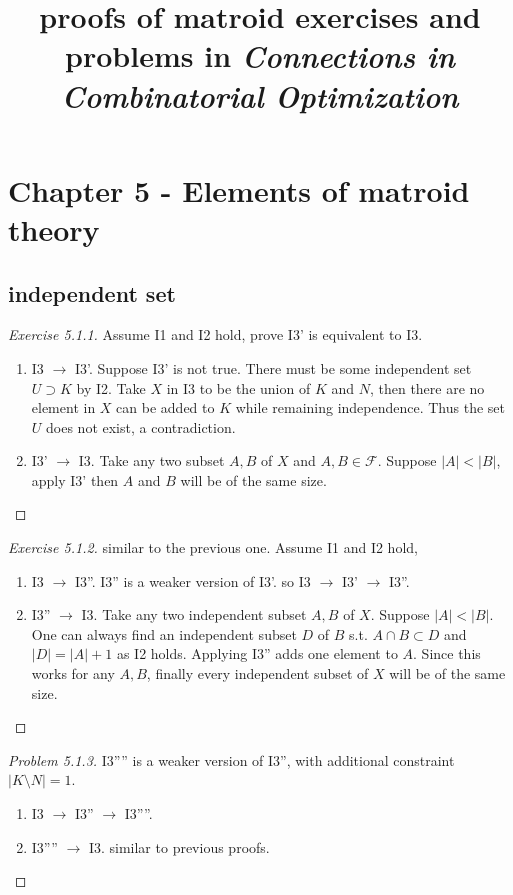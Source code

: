 \documentclass[12pt]{article}
\title{proofs of matroid exercises and problems in \textit{Connections in Combinatorial Optimization}}
\date{}
\begin{document}
\maketitle
\tableofcontents
\newpage

\section{Chapter 5 - Elements of matroid theory}
\subsection{independent set}
\begin{proof}[Exercise 5.1.1]
    Assume I1 and I2 hold, prove I3' is equivalent to I3.
    \begin{enumerate}
        \item I3 $\to$ I3'. Suppose I3' is not true. There must be some independent set $U\supset K$ by I2. Take $X$ in I3 to be the union of $K$ and $N$, then there are no element in $X$ can be added to $K$ while remaining independence. Thus the set $U$ does not exist, a contradiction.
        \item I3' $\to$ I3. Take any two subset $A,B$ of $X$ and $A,B\in \mathcal F$. Suppose $|A|<|B|$, apply I3' then $A$ and $B$ will be of the same size.
    \end{enumerate}
\end{proof}
\begin{proof}[Exercise 5.1.2]
    similar to the previous one. Assume I1 and I2 hold,
    \begin{enumerate}
        \item I3 $\to$ I3''. I3'' is a weaker version of I3'. so I3 $\to$ I3' $\to$ I3''.
        \item I3'' $\to$ I3. Take any two independent subset $A,B$ of $X$. Suppose $|A|<|B|$. One can always find an independent subset $D$ of $B$ s.t. $A\cap B \subset D$ and $|D|=|A|+1$ as I2 holds. Applying I3'' adds one element to $A$. Since this works for any $A,B$, finally every independent subset of $X$ will be of the same size.
    \end{enumerate}
\end{proof}
\begin{proof}[Problem 5.1.3]
    I3'''' is a weaker version of I3'', with additional constraint $|K\setminus N|=1$.
    \begin{enumerate}
        \item I3 $\to$ I3'' $\to$ I3''''.
        \item I3'''' $\to$ I3. similar to previous proofs.
    \end{enumerate}
\end{proof}
\end{document}
